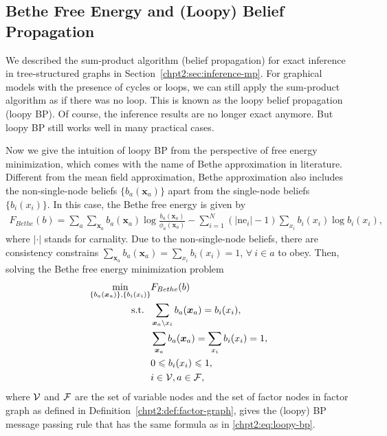 \subsection{Bethe Free Energy and (Loopy) Belief Propagation}

We described the sum-product algorithm (belief propagation) for exact inference in tree-structured graphs in Section~\ref{chpt2:sec:inference-mp}. For graphical models with the presence of cycles or loops, we can still apply the sum-product algorithm as if there was no loop. This is known as the loopy belief propagation (loopy BP). Of course, the inference results are no longer exact anymore. But loopy BP still works well in many practical cases.

Now we give the intuition of loopy BP from the perspective of free energy minimization, which comes with the name of Bethe approximation in literature.
Different from the mean field approximation, Bethe approximation also includes the non-single-node beliefs $\{b_{a}(\bm{x}_{a})\}$ apart from the single-node beliefs $\{b_i(x_i)\}$\cite{yedidia2003understanding}. In this case, the Bethe free energy is given by
\begin{align}\label{chpt2:bethe-free-energy}
  F_{Bethe}(b) = \sum_{a} \sum_{\bm{x}_{a}}
  b_{a}(\bm{x}_{a})\log{\frac{b_{a}(\bm{x}_{a})}{\phi_{a}(\bm{x}_{a})}
  } -  \sum_{i=1}^{N} (|\mathrm{ne}_i| - 1) \sum_{x_i} b_i(x_i) \log{b_i(x_i)},
\end{align}
where $|\cdot|$ stands for carnality.
Due to the  non-single-node beliefs, there are consistency constrains $\sum_{\bm{x}_{a}} b_{a}(\bm{x}_{a}) = \sum_{ x_i} b_i({x}_i) =1$, $\forall~ i \in a$ to obey. Then, solving the Bethe free energy minimization problem
\begin{align}
  \min_{\{b_{a}(\bm{x}_{a})\}, \{b_i(x_i)\}}& F_{Bethe}(b) \nonumber \\
  \mathrm{s.t.}~~ & \sum_{\bm{x}_{a} \backslash x_i} b_{a}(\bm{x}_{a})  =
                    b_i(x_i), \nonumber \\
                                                      & \sum_{\bm{x}_{a}} b_{a}(\bm{x}_{a}) = \sum_{ x_i} b_i({x}_i) =1,
                                                        \nonumber \\
                                                      &  0 \leqslant b_i(x_i) \leqslant 1,  \nonumber \\
                                                      & i \in \mathcal{V} , a \in \mathcal{F},
\end{align}
where $\mathcal{V}$ and $\mathcal{F}$ are the set of variable nodes and the set of
factor nodes in factor graph as defined in
Definition~\ref{chpt2:def:factor-graph}, gives the (loopy) BP message passing rule that has the same formula as in \eqref{chpt2:eq:loopy-bp}.

